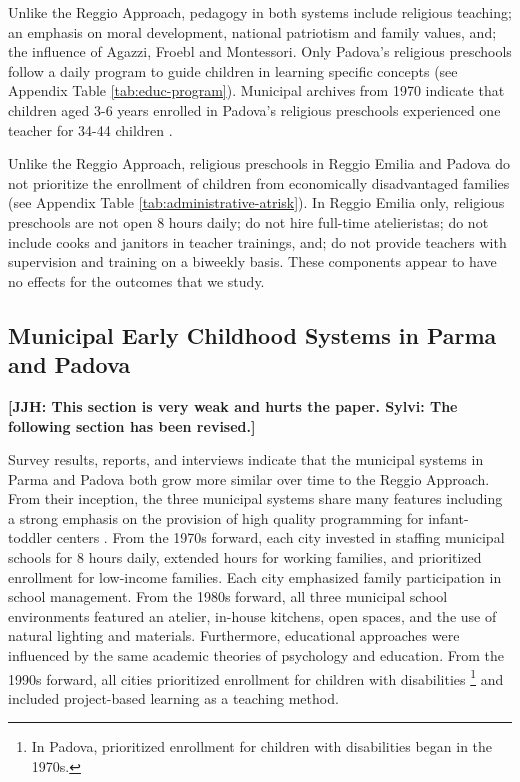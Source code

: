 Unlike the Reggio Approach, pedagogy in both systems include religious teaching; an emphasis on moral development, national patriotism and family values, and; the influence of Agazzi, Froebl and Montessori. Only Padova's religious preschools follow a daily program to guide children in learning specific concepts (see Appendix Table \ref{tab:educ-program}). Municipal archives from 1970 indicate that children aged 3-6 years enrolled in Padova's religious preschools experienced one teacher for 34-44 children \citep{Padova-Admin-Data_1964-2011}. 

Unlike the Reggio Approach, religious preschools in Reggio Emilia and Padova do not prioritize the enrollment of children from economically disadvantaged families (see Appendix Table \ref{tab:administrative-atrisk}).  In Reggio Emilia only, religious preschools are not open 8 hours daily; do not hire full-time atelieristas; do not include cooks and janitors in teacher trainings, and; do not provide teachers with supervision and training on a biweekly basis. These components appear to have no effects for the outcomes that we study.

\subsection{Municipal Early Childhood Systems in Parma and Padova}

\textbf{[JJH: This section is very weak and hurts the paper. Sylvi: The following section has been revised.]}

Survey results, reports, and interviews indicate that the municipal systems in Parma and Padova both grow more similar over time to the Reggio Approach. From their inception, the three municipal systems share many features including a strong emphasis on the provision of high quality programming for infant-toddler centers \citep{Ghedini_2001_Ital-Natl-Policy}. From the 1970s forward, each city invested in staffing municipal schools for 8 hours daily, extended hours for working families, and prioritized enrollment for low-income families. Each city emphasized family participation in school management. From the 1980s forward, all three municipal school environments featured an atelier, in-house kitchens, open spaces, and the use of natural lighting and materials. Furthermore, educational approaches were influenced by the same academic theories of psychology and education. From the 1990s forward, all cities prioritized enrollment for children with disabilities \footnote{In Padova, prioritized enrollment for children with disabilities began in the 1970s.} and included project-based learning as a teaching method.

